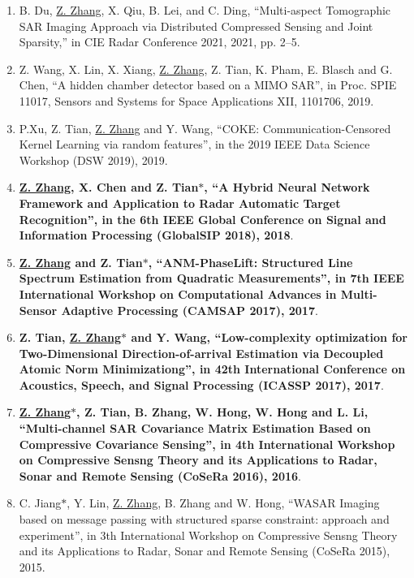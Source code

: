 \documentclass[paper=a4,fontsize=11pt]{scrartcl}
\begin{document}
\begin{enumerate}
\item B. Du, \underline{Z. Zhang}, X. Qiu, B. Lei, and C. Ding, ``Multi-aspect Tomographic SAR Imaging Approach via Distributed Compressed Sensing and Joint Sparsity,'' in CIE Radar Conference 2021, 2021, pp. 2–5.
	
\item {Z. Wang, X. Lin, X. Xiang, \underline{Z. Zhang}, Z. Tian, K. Pham, E. Blasch and G. Chen, ``A hidden chamber detector based on a MIMO SAR'', in Proc. SPIE 11017, Sensors and Systems for Space Applications XII, 1101706, 2019}.	
	
\item {P.Xu, Z. Tian, \underline{Z. Zhang} and Y. Wang, ``COKE: Communication-Censored Kernel Learning via random features'', in the 2019 IEEE Data Science Workshop (DSW 2019), 2019}.	
	
\item \textbf{\underline{Z. Zhang}, X. Chen and Z. Tian$\ast$, ``A Hybrid Neural Network Framework and Application to Radar Automatic Target Recognition'', in the 6th IEEE Global Conference on Signal and Information Processing (GlobalSIP 2018), 2018}.

\item \textbf{\underline{Z. Zhang} and Z. Tian$\ast$, ``ANM-PhaseLift: Structured Line Spectrum Estimation from Quadratic Measurements'', in 7th IEEE International Workshop on Computational Advances in Multi-Sensor Adaptive Processing (CAMSAP 2017), 2017}.

\item \textbf{Z. Tian, \underline{Z. Zhang$\ast$} and Y. Wang, ``Low-complexity optimization for Two-Dimensional Direction-of-arrival Estimation via Decoupled Atomic Norm Minimizationg'', in 42th International Conference on Acoustics, Speech, and Signal Processing (ICASSP 2017), 2017}.

\item \textbf{\underline{Z. Zhang$\ast$}, Z. Tian, B. Zhang, W. Hong, W. Hong and L. Li, ``Multi-channel SAR Covariance Matrix Estimation Based on Compressive Covariance Sensing'', in 4th International Workshop on Compressive Sensng Theory and its Applications to Radar, Sonar and Remote Sensing (CoSeRa 2016), 2016}.

\item C. Jiang$\ast$, Y. Lin, \underline{Z. Zhang}, B. Zhang and W. Hong, ``WASAR Imaging based on message passing with structured sparse constraint: approach and experiment'', in 3th International Workshop on Compressive Sensng Theory and its Applications to Radar, Sonar and Remote Sensing (CoSeRa 2015), 2015.


\end{enumerate}
\end{document}
